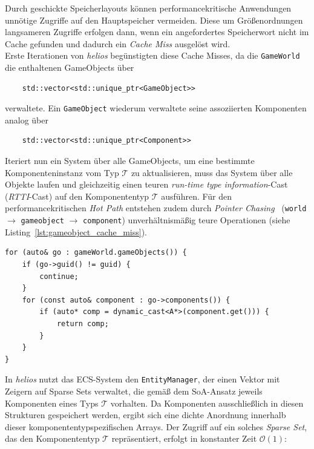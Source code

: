 Durch geschickte Speicherlayouts können performancekritische Anwendungen unnötige Zugriffe auf den Hauptspeicher vermeiden.
Diese um Größenordnungen langsameren Zugriffe erfolgen dann, wenn ein angefordertes Speicherwort nicht im Cache gefunden  und dadurch ein \textit{Cache Miss} ausgelöst wird.\\

Erste Iterationen von \textit{helios} begünstigten diese Cache Misses, da die \texttt{GameWorld} die enthaltenen GameObjects über

\begin{verbatim}
    std::vector<std::unique_ptr<GameObject>>
\end{verbatim}

\noindent
verwaltete.
Ein \texttt{GameObject} wiederum verwaltete seine assoziierten Komponenten analog über
\begin{verbatim}
    std::vector<std::unique_ptr<Component>>
\end{verbatim}

\noindent
Iteriert nun ein System über alle GameObjects, um eine bestimmte Komponenteninstanz vom Typ $\mathcal{T}$ zu aktualisieren, muss das System über alle Objekte laufen und gleichzeitig einen teuren \textit{run-time type information}-Cast (\textit{RTTI}-Cast) auf den Komponententyp $\mathcal{T}$ ausführen.
Für den performancekritischen \textit{Hot Path} entstehen zudem durch \textit{Pointer Chasing}~\cite{HKSN+16} (\texttt{world} $\rightarrow$ \texttt{gameobject} $\rightarrow$ \texttt{component}) unverhältnismäßig teure Operationen (siehe Listing~\ref{lst:gameobject_cache_miss}).

\vspace{5mm}
\begin{lstlisting}[style=c++style,
caption={Codebeispiel für die Iteration über alle GameObjects, um Komponenten eines bestimmten Typs $\mathcal{T}$ zu finden (Meilenstein~3). Die Implementierung begünstigt \textit{Cache Misses}, da die angefragten Daten nicht in zusammenhängenden Speicherbereichen liegen.},
label=lst:gameobject_cache_miss]
for (auto& go : gameWorld.gameObjects()) {
    if (go->guid() != guid) {
        continue;
    }
    for (const auto& component : go->components()) {
        if (auto* comp = dynamic_cast<A*>(component.get())) {
            return comp;
        }
    }
}
\end{lstlisting}
\vspace{5mm}

In \textit{helios} nutzt das ECS-System den \texttt{EntityManager}, der einen Vektor mit Zeigern auf Sparse Sets verwaltet, die gemäß dem SoA-Ansatz jeweils Komponenten eines Typs $\mathcal{T}$ vorhalten.
Da Komponenten ausschließlich in diesen Strukturen gespeichert werden, ergibt sich eine dichte Anordnung innerhalb dieser komponententypspezifischen Arrays.
Der Zugriff auf ein solches \textit{Sparse Set}, das den Komponententyp $\mathcal{T}$ repräsentiert, erfolgt in konstanter Zeit $\mathcal{O}(1)$:

